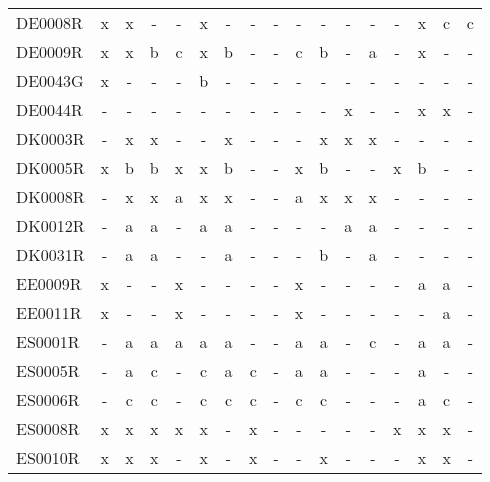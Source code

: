 \begin{table}
{{\begin{tabular}{l|cccccccccccccccc}
        DE0008R &  x &   x &    - &      - &   x &    - &    - &    - &      - &    - &    - &   - &      - &    x &    c &     c \\
        DE0009R &  x &   x &    b &      c &   x &    b &    - &    - &      c &    b &    - &   a &      - &    x &    - &     - \\
        DE0043G &  x &   - &    - &      - &   b &    - &    - &    - &      - &    - &    - &   - &      - &    - &    - &     - \\
        DE0044R &  - &   - &    - &      - &   - &    - &    - &    - &      - &    - &    x &   - &      - &    x &    x &     - \\
        DK0003R &  - &   x &    x &      - &   - &    x &    - &    - &      - &    x &    x &   x &      - &    - &    - &     - \\
        DK0005R &  x &   b &    b &      x &   x &    b &    - &    - &      x &    b &    - &   - &      x &    b &    - &     - \\
        DK0008R &  - &   x &    x &      a &   x &    x &    - &    - &      a &    x &    x &   x &      - &    - &    - &     - \\
        DK0012R &  - &   a &    a &      - &   a &    a &    - &    - &      - &    - &    a &   a &      - &    - &    - &     - \\
        DK0031R &  - &   a &    a &      - &   - &    a &    - &    - &      - &    b &    - &   a &      - &    - &    - &     - \\
        EE0009R &  x &   - &    - &      x &   - &    - &    - &    - &      x &    - &    - &   - &      - &    a &    a &     - \\
        EE0011R &  x &   - &    - &      x &   - &    - &    - &    - &      x &    - &    - &   - &      - &    - &    a &     - \\
        ES0001R &  - &   a &    a &      a &   a &    a &    - &    - &      a &    a &    - &   c &      - &    a &    a &     - \\
        ES0005R &  - &   a &    c &      - &   c &    a &    c &    - &      a &    a &    - &   - &      - &    a &    - &     - \\
        ES0006R &  - &   c &    c &      - &   c &    c &    c &    - &      c &    c &    - &   - &      - &    a &    c &     - \\
        ES0008R &  x &   x &    x &      x &   x &    - &    x &    - &      - &    - &    - &   - &      x &    x &    x &     - \\
        ES0010R &  x &   x &    x &      - &   x &    - &    x &    - &      - &    x &    - &   - &      - &    x &    x &     - \\

\end{tabular}}}
\end{table}
